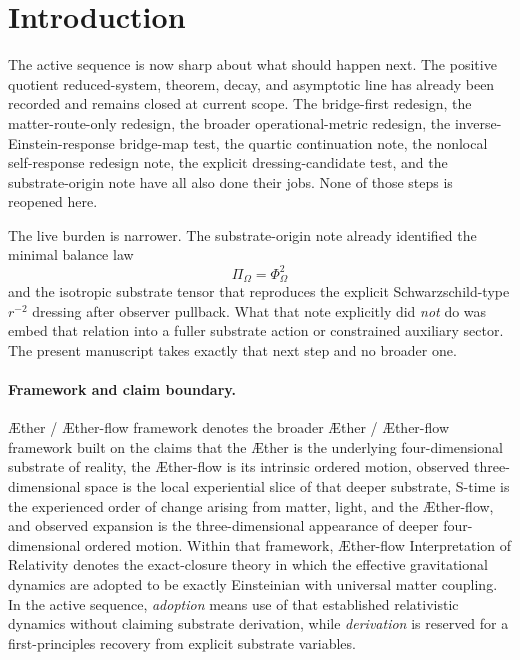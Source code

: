 \documentclass[11pt]{article}
\newcommand{\Aether}{\AE{}ther}
\newcommand{\Aflow}{\AE{}ther-flow}
\newcommand{\TheoryName}{\Aflow{} Interpretation of Relativity}
\newcommand{\TheoryProgram}{\Aether{} / \Aflow{} framework}
\newcommand{\FlowPot}{\Phi_\Omega}
\newcommand{\BalanceField}{\Pi_\Omega}
\begin{document}
\begin{abstract}
This note is still not a completed microphysical derivation of Einsteinian gravity from substrate first principles. It records the constrained auxiliary-sector realization that the active sequence now needed. The deeper remaining burden is then narrower: replace the still-given charge potential \(\FlowPot\) or the reconstruction-level constrained sector by a more intrinsic substrate action without losing the exact-closure benchmark already fixed by the active manuscripts.
\end{abstract}

\section{Introduction}

The active sequence is now sharp about what should happen next. The positive quotient reduced-system, theorem, decay, and asymptotic line has already been recorded and remains closed at current scope. The bridge-first redesign, the matter-route-only redesign, the broader operational-metric redesign, the inverse-Einstein-response bridge-map test, the quartic continuation note, the nonlocal self-response redesign note, the explicit dressing-candidate test, and the substrate-origin note have all also done their jobs. None of those steps is reopened here.

The live burden is narrower. The substrate-origin note already identified the minimal balance law
\[
\BalanceField=\FlowPot^2
\]
and the isotropic substrate tensor that reproduces the explicit Schwarzschild-type \(r^{-2}\) dressing after observer pullback. What that note explicitly did \emph{not} do was embed that relation into a fuller substrate action or constrained auxiliary sector. The present manuscript takes exactly that next step and no broader one.

\paragraph{Framework and claim boundary.}
\TheoryProgram{} denotes the broader \Aether{} / \Aflow{} framework built on the claims that the \Aether{} is the underlying four-dimensional substrate of reality, the \Aflow{} is its intrinsic ordered motion, observed three-dimensional space is the local experiential slice of that deeper substrate, S-time is the experienced order of change arising from matter, light, and the \Aflow{}, and observed expansion is the three-dimensional appearance of deeper four-dimensional ordered motion. Within that framework, \TheoryName{} denotes the exact-closure theory in which the effective gravitational dynamics are adopted to be exactly Einsteinian with universal matter coupling. In the active sequence, \emph{adoption} means use of that established relativistic dynamics without claiming substrate derivation, while \emph{derivation} is reserved for a first-principles recovery from explicit substrate variables.
\end{document}
